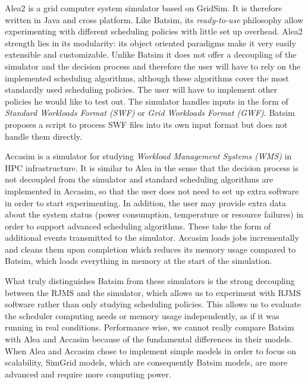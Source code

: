 Alea2 \cite{alea2} is a grid computer system simulator based on GridSim. It is
therefore written in Java and cross platform. Like Batsim, its
\textit{ready-to-use} philosophy allow experimenting with different scheduling
policies with little set up overhead.  Alea2 strength lies in its modularity:
its object oriented paradigms make it very easily extensible and customizable.
Unlike Batsim it does not offer a decoupling of the simulator and the decision
process and therefore the user will have to rely on the implemented scheduling
algorithms, although these algorithms cover the most standardly used scheduling
policies.  The user will have to implement other policies he would like to test
out. The simulator handles inputs in the form of \textit{Standard Workloads
Format (SWF)} or \textit{Grid Workloads Format (GWF)}. Batsim proposes a script
to process SWF files into its own input format but does not handle them
directly.

Accasim \cite{10.1007/978-3-319-73353-1_12} is a simulator for studying
\textit{Workload Management Systems (WMS)} in HPC infrastructure. It is similar
to Alea in the sense that the decision process is not decoupled from the
simulator and standard scheduling algorithms are implemented in Accasim, so
that the user does not need to set up extra software in order to start
experimenting. In addition, the user may provide extra data about the system
status (power consumption, temperature or resource failures) in order to
support advanced scheduling algorithms.  These take the form of additional
events transmitted to the simulator. Accasim loads jobs incrementally and
cleans them upon completion which reduces its memory usage compared to Batsim,
which loads everything in memory at the start of the simulation.

What truly distinguishes Batsim from these simulators is the strong decoupling
between the RJMS and the simulator, which allows us to experiment with RJMS
software rather than only studying scheduling policies. This allows us to
evaluate the scheduler computing needs or memory usage independently, as if it
was running in real conditions. Performance wise, we cannot really compare
Batsim with Alea and Accasim because of the fundamental differences in their
models. When Alea and Accasim chose to implement simple models in order to
focus on scalability, SimGrid models, which are consequently Batsim models, are
more advanced and require more computing power.

